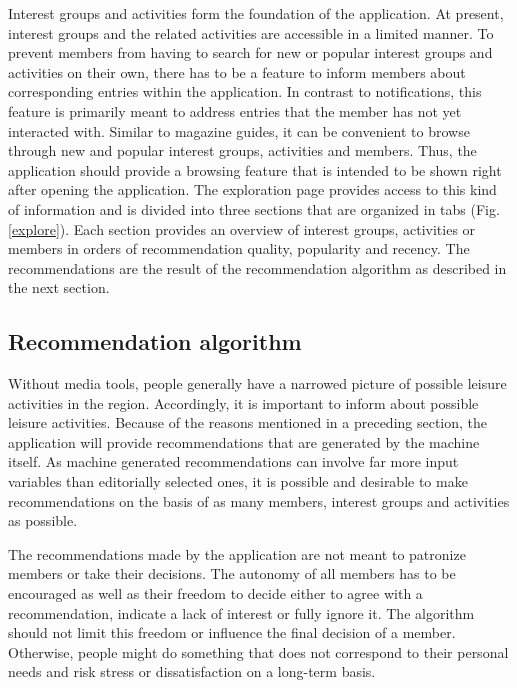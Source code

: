 \documentclass[12pt,numbers=noenddot,parskip,bibliography=totocnumbered,listof=totocnumbered,draft]{scrreprt}
\begin{document}
Interest groups and activities form the foundation of the application. At present, interest groups and the related activities are accessible in a limited manner. To prevent members from having to search for new or popular interest groups and activities on their own, there has to be a feature to inform members about corresponding entries within the application. In contrast to notifications, this feature is primarily meant to address entries that the member has not yet interacted with. Similar to magazine guides, it can be convenient to browse through new and popular interest groups, activities and members. Thus, the application should provide a browsing feature that is intended to be shown right after opening the application. The exploration page provides access to this kind of information and is divided into three sections that are organized in tabs (Fig. \ref{explore}). Each section provides an overview of interest groups, activities or members in orders of recommendation quality, popularity and recency. The recommendations are the result of the recommendation algorithm as described in the next section.

\subsection{Recommendation algorithm}
Without media tools, people generally have a narrowed picture of possible leisure activities in the region. Accordingly, it is important to inform about possible leisure activities. Because of the reasons mentioned in a preceding section, the application will provide recommendations that are generated by the machine itself. As machine generated recommendations can involve far more input variables than editorially selected ones, it is possible and desirable to make recommendations on the basis of as many members, interest groups and activities as possible.

The recommendations made by the application are not meant to patronize members or take their decisions. The autonomy of all members has to be encouraged as well as their freedom to decide either to agree with a recommendation, indicate a lack of interest or fully ignore it. The algorithm should not limit this freedom or influence the final decision of a member. Otherwise, people might do something that does not correspond to their personal needs and risk stress or dissatisfaction on a long-term basis.
\end{document}
